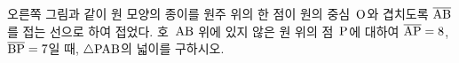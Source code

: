 \noindent\begin{minipage}[t]{0.58\linewidth}\vspace{0pt}\raggedright 오른쪽 그림과 같이 원 모양의 종이를 원주 위의 한 점이 원의 중심~$\mathrm{O}$와 겹치도록 $\overline{\mathrm{AB}}$를 접는 선으로 하여 접었다. 호~$\mathrm{AB}$ 위에 있지 않은 원 위의 점~$\mathrm{P}$에 대하여 $\overline{\mathrm{AP}}=8$, $\overline{\mathrm{BP}}=7$일 때, $\triangle\mathrm{PAB}$의 넓이를 구하시오.\end{minipage}\hfill\begin{minipage}[t]{0.4\linewidth}\vspace{0pt}\centering \resizebox{\ifdim\width>\linewidth\linewidth\else\width\fi}{!}{}\end{minipage}\par

